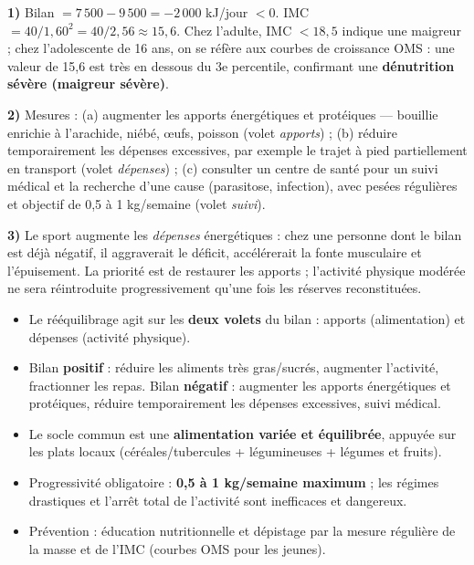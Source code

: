 \documentclass[11pt]{article}
\begin{document}
\begin{corrige}[Exercice]
\textbf{1)} Bilan $= 7\,500 - 9\,500 = -2\,000$ kJ/jour $< 0$. IMC $= 40 / 1,60^2 = 40/2,56 \approx 15,6$. Chez l'adulte, IMC $< 18,5$ indique une maigreur ; chez l'adolescente de 16 ans, on se réfère aux courbes de croissance OMS : une valeur de 15,6 est très en dessous du 3e percentile, confirmant une \textbf{dénutrition sévère (maigreur sévère)}.

\textbf{2)} Mesures : (a) augmenter les apports énergétiques et protéiques — bouillie enrichie à l'arachide, niébé, œufs, poisson (volet \emph{apports}) ; (b) réduire temporairement les dépenses excessives, par exemple le trajet à pied partiellement en transport (volet \emph{dépenses}) ; (c) consulter un centre de santé pour un suivi médical et la recherche d'une cause (parasitose, infection), avec pesées régulières et objectif de 0,5 à 1 kg/semaine (volet \emph{suivi}).

\textbf{3)} Le sport augmente les \emph{dépenses} énergétiques : chez une personne dont le bilan est déjà négatif, il aggraverait le déficit, accélérerait la fonte musculaire et l'épuisement. La priorité est de restaurer les apports ; l'activité physique modérée ne sera réintroduite progressivement qu'une fois les réserves reconstituées.
\end{corrige}

\begin{aretenir}
\begin{itemize}
\item Le rééquilibrage agit sur les \textbf{deux volets} du bilan : apports (alimentation) et dépenses (activité physique).
\item Bilan \textbf{positif} : réduire les aliments très gras/sucrés, augmenter l'activité, fractionner les repas. Bilan \textbf{négatif} : augmenter les apports énergétiques et protéiques, réduire temporairement les dépenses excessives, suivi médical.
\item Le socle commun est une \textbf{alimentation variée et équilibrée}, appuyée sur les plats locaux (céréales/tubercules + légumineuses + légumes et fruits).
\item Progressivité obligatoire : \textbf{0,5 à 1 kg/semaine maximum} ; les régimes drastiques et l'arrêt total de l'activité sont inefficaces et dangereux.
\item Prévention : éducation nutritionnelle et dépistage par la mesure régulière de la masse et de l'IMC (courbes OMS pour les jeunes).
\end{itemize}
\end{aretenir}
\end{document}

